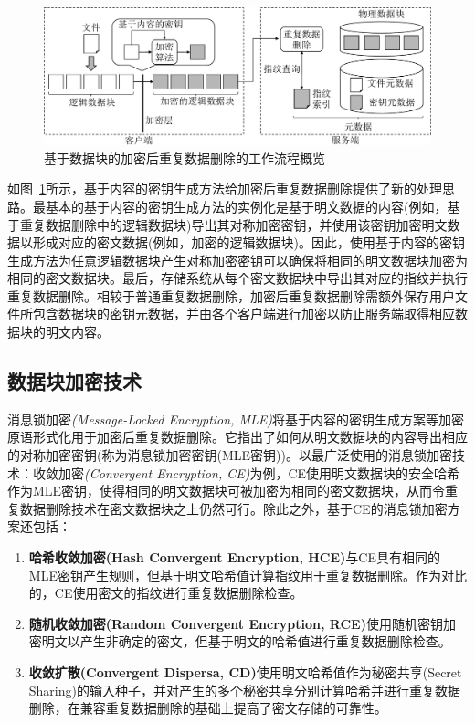 \begin{figure}[!htb]
    \small
    \centering
    \includegraphics[width=\textwidth]{pic/background/chunk-based-enc-dedup-arch.pdf}
    \caption{基于数据块的加密后重复数据删除的工作流程概览}
    \label{fig:chunk-based-enc-dedup-flow}
\end{figure}

如图~\ref{fig:chunk-based-enc-dedup-flow}所示，基于内容的密钥生成方法给加密后重复数据删除提供了新的处理思路。最基本的基于内容的密钥生成方法的实例化是基于明文数据的内容(例如，基于重复数据删除中的逻辑数据块)导出其对称加密密钥，并使用该密钥加密明文数据以形成对应的密文数据(例如，加密的逻辑数据块)。因此，使用基于内容的密钥生成方法为任意逻辑数据块产生对称加密密钥可以确保将相同的明文数据块加密为相同的密文数据块。最后，存储系统从每个密文数据块中导出其对应的指纹并执行重复数据删除。相较于普通重复数据删除，加密后重复数据删除需额外保存用户文件所包含数据块的密钥元数据，并由各个客户端进行加密以防止服务端取得相应数据块的明文内容。

\subsection{数据块加密技术}
\label{subsec:background-encrypted-deduplication-key}

消息锁加密\textit{(Message-Locked Encryption, MLE)}\cite{bellare2013MLE}将基于内容的密钥生成方案等加密原语形式化用于加密后重复数据删除。它指出了如何从明文数据块的内容导出相应的对称加密密钥(称为消息锁加密密钥(MLE密钥))。以最广泛使用的消息锁加密技术：收敛加密\textit{(Convergent Encryption, CE)}\cite{douceur2002reclaiming}为例，CE使用明文数据块的安全哈希作为MLE密钥，使得相同的明文数据块可被加密为相同的密文数据块，从而令重复数据删除技术在密文数据块之上仍然可行。除此之外，基于CE的消息锁加密方案还包括：

\begin{enumerate}[leftmargin=0em]
    \item \textbf{哈希收敛加密(Hash Convergent Encryption, HCE)}\cite{douceur2002reclaiming}与CE具有相同的MLE密钥产生规则，但基于明文哈希值计算指纹用于重复数据删除。作为对比的，CE使用密文的指纹进行重复数据删除检查。
    \item \textbf{随机收敛加密(Random Convergent Encryption, RCE)}\cite{douceur2002reclaiming}使用随机密钥加密明文以产生非确定的密文，但基于明文的哈希值进行重复数据删除检查。
    \item \textbf{收敛扩散(Convergent Dispersa, CD)}\cite{li2016cdstore}使用明文哈希值作为秘密共享(Secret Sharing)的输入种子，并对产生的多个秘密共享分别计算哈希并进行重复数据删除，在兼容重复数据删除的基础上提高了密文存储的可靠性。
\end{enumerate}

